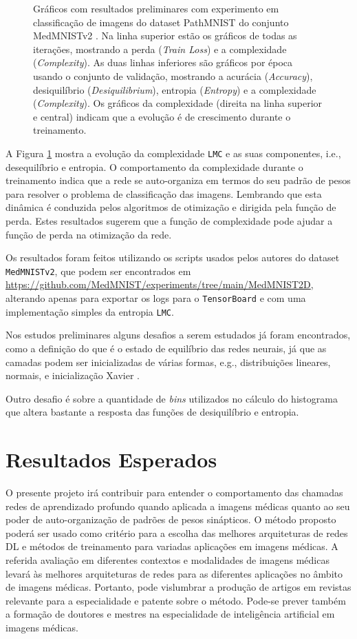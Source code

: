\documentclass[
	12pt,				%
	openany,oneside,
	a4paper,			%
	english,			%
	brazil,				%
	]{abntex2}
\begin{document}
\begin{figure}
\caption{\label{fig3}Gráficos com resultados preliminares com experimento em classificação de imagens do dataset PathMNIST do conjunto MedMNISTv2 \cite{MEDMNIST}. Na linha superior estão os gráficos de todas as iterações, mostrando a perda (\textit{Train Loss}) e a complexidade (\textit{Complexity}). As duas linhas inferiores são gráficos por época usando o conjunto de validação, mostrando a acurácia (\textit{Accuracy}), desiquilíbrio (\textit{Desiquilibrium}), entropia (\textit{Entropy}) e a complexidade (\textit{Complexity}). Os gráficos da complexidade (direita na linha superior e central) indicam que a evolução é de crescimento durante o treinamento. }
\end{figure}

A Figura \ref{fig3} mostra a evolução da complexidade \texttt{LMC} e as suas componentes, i.e., desequilíbrio e entropia. O comportamento da complexidade durante o treinamento indica que a rede se auto-organiza em termos do seu padrão de pesos para resolver o problema de classificação das imagens. Lembrando que esta dinâmica é conduzida pelos algoritmos de otimização e dirigida pela função de perda. Estes resultados sugerem que a função de complexidade pode ajudar a função de perda na otimização da rede.

Os resultados foram feitos utilizando os scripts usados pelos autores do dataset \texttt{MedMNISTv2}, que podem ser encontrados em \url{https://github.com/MedMNIST/experiments/tree/main/MedMNIST2D}, alterando apenas para exportar os logs para o \texttt{TensorBoard} e com uma implementação simples da entropia \texttt{LMC}.

Nos estudos preliminares alguns desafios a serem estudados já foram encontrados, como a definição do que é o estado de equilíbrio das redes neurais, já que as camadas podem ser inicializadas de várias formas, e.g., distribuições lineares, normais, e inicialização Xavier \cite{Glorot2010}.

Outro desafio é sobre a quantidade de \textit{bins} utilizados no cálculo do histograma que altera bastante a resposta das funções de desiquilíbrio e entropia.

\chapter{Resultados Esperados}
O presente projeto irá contribuir para entender o comportamento das chamadas redes de aprendizado profundo quando aplicada a imagens médicas quanto ao seu poder de auto-organização de padrões de pesos sinápticos. O método proposto poderá ser usado como critério para a escolha das melhores arquiteturas de redes DL e métodos de treinamento para variadas aplicações em imagens médicas. A referida avaliação em diferentes contextos e modalidades de imagens médicas levará às melhores arquiteturas de redes para as diferentes aplicações no âmbito de imagens médicas. Portanto, pode vislumbrar a produção de artigos em revistas relevante para a especialidade e patente sobre o método. Pode-se prever também a formação de doutores e mestres na especialidade de inteligência artificial em imagens médicas.
\end{document}
